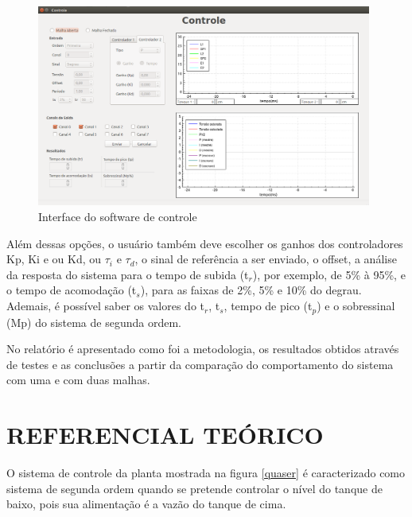 \documentclass[a4paper,12pt]{article}
\begin{document}
\begin{flushleft}
\begin{figure}[H]
\centering
\includegraphics[width=11cm]{ImagensLab4/interface-versao4.png}
\caption{Interface do software de controle}
\label{interface}
\end{figure}

\hspace{4ex}Além dessas opções, o usuário também deve escolher os ganhos dos controladores Kp, Ki e ou Kd, ou $\tau_i$ e $\tau_d$, o  sinal de referência a ser enviado, o offset, a análise da resposta do sistema para o tempo de subida (t$_r$), por exemplo, de 5\% à 95\%, e o tempo de acomodação (t$_s$), para as faixas de 2\%, 5\% e 10\% do degrau. Ademais, é possível saber os valores do  t$_r$, t$_s$, tempo de pico (t$_p$) e o sobressinal (Mp) do sistema de segunda ordem.

\hspace{4ex}No relatório é apresentado como foi a metodologia, os resultados obtidos através de testes e as conclusões a partir da comparação do comportamento do sistema com uma e com duas malhas.

\end{flushleft}

\newpage


\thispagestyle{main}

\section{REFERENCIAL TEÓRICO}

\hspace{4ex}O sistema de controle da planta mostrada na figura \ref{quaser} é caracterizado como sistema de segunda ordem quando se pretende controlar o nível do tanque de baixo, pois sua alimentação é a vazão do tanque de cima.
\end{document}
